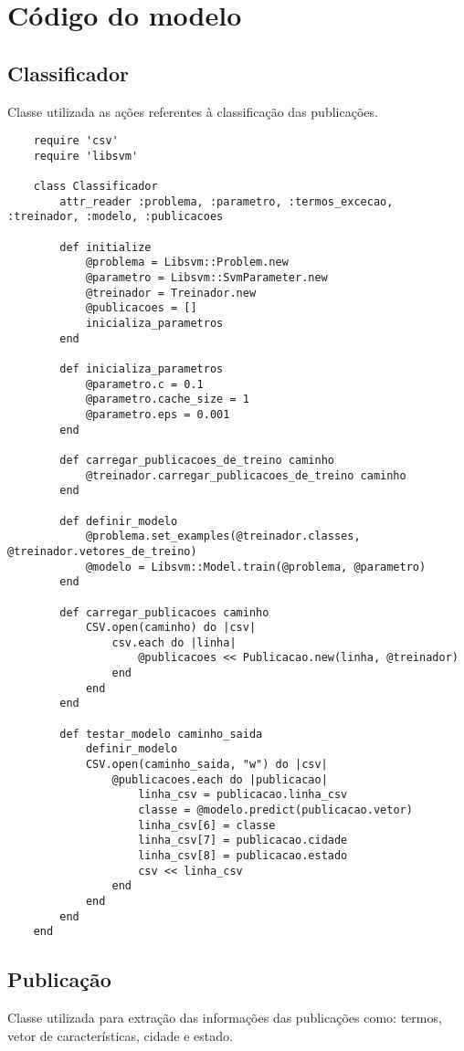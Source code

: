 \appendix

\chapter{Código do modelo}

\section{Classificador}

Classe utilizada as ações referentes à classificação das publicações.

\begin{lstlisting}
	require 'csv'
	require 'libsvm'

	class Classificador
		attr_reader :problema, :parametro, :termos_excecao, :treinador, :modelo, :publicacoes

		def initialize
			@problema = Libsvm::Problem.new
			@parametro = Libsvm::SvmParameter.new
			@treinador = Treinador.new
			@publicacoes = []
			inicializa_parametros
		end

		def inicializa_parametros
			@parametro.c = 0.1
			@parametro.cache_size = 1
			@parametro.eps = 0.001
		end

		def carregar_publicacoes_de_treino caminho
			@treinador.carregar_publicacoes_de_treino caminho
		end

		def definir_modelo
			@problema.set_examples(@treinador.classes, @treinador.vetores_de_treino)
			@modelo = Libsvm::Model.train(@problema, @parametro)
		end

		def carregar_publicacoes caminho
			CSV.open(caminho) do |csv|
				csv.each do |linha|
					@publicacoes << Publicacao.new(linha, @treinador)
				end
			end
		end

		def testar_modelo caminho_saida
			definir_modelo
			CSV.open(caminho_saida, "w") do |csv|
				@publicacoes.each do |publicacao|
					linha_csv = publicacao.linha_csv
					classe = @modelo.predict(publicacao.vetor)
					linha_csv[6] = classe
					linha_csv[7] = publicacao.cidade
					linha_csv[8] = publicacao.estado
					csv << linha_csv
				end
			end
		end
	end
\end{lstlisting}

\section{Publicação}

Classe utilizada para extração das informações das publicações como: termos, vetor de características, cidade e estado.

